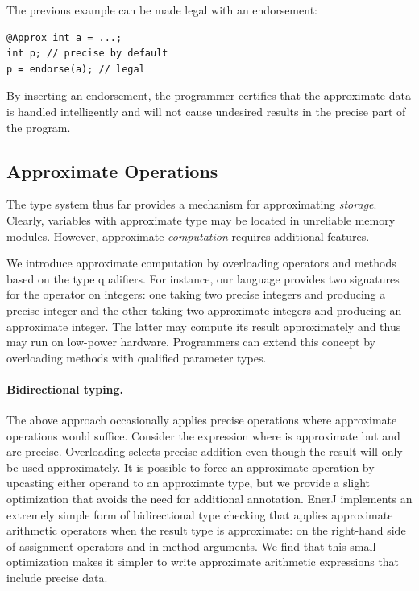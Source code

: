The previous example can be made legal with an endorsement:
\begin{lstlisting}
@Approx int a = ...;
int p; // precise by default
p = endorse(a); // legal
\end{lstlisting}
By inserting an endorsement,
the programmer certifies that the approximate data is handled
intelligently and will not cause undesired results in the precise part of
the program.


\subsection{Approximate Operations}
\label{sec:approx}

The type system thus far provides a mechanism for approximating
\emph{storage}. Clearly, variables with approximate type may be
located in unreliable memory modules. However,
approximate \emph{computation} requires additional features. %

We introduce approximate computation by overloading operators and
methods based on the type qualifiers. For instance, our
language provides two signatures for the \ilcode{+} operator on
integers: one taking two precise integers and producing a precise
integer and the other taking two approximate integers and producing an
approximate integer. The latter may compute its result
approximately and thus may run on low-power hardware.
Programmers can extend this concept by overloading methods with
qualified parameter types.

\paragraph{Bidirectional typing.}
The above approach occasionally applies precise operations where
approximate operations would suffice. Consider the expression 
where  is approximate but  and  are
precise. Overloading selects precise addition even
though the result will only be used approximately. It is possible to force
an approximate operation by upcasting either operand to an approximate
type, but we provide a slight optimization that avoids the need for additional
annotation.
EnerJ implements an extremely simple form of bidirectional type checking
\cite{bdtyping} that applies approximate arithmetic operators
when the result type is approximate: on the right-hand side of assignment
operators and in method arguments. We find that this small optimization makes
it simpler to write approximate arithmetic expressions that include precise
data.


